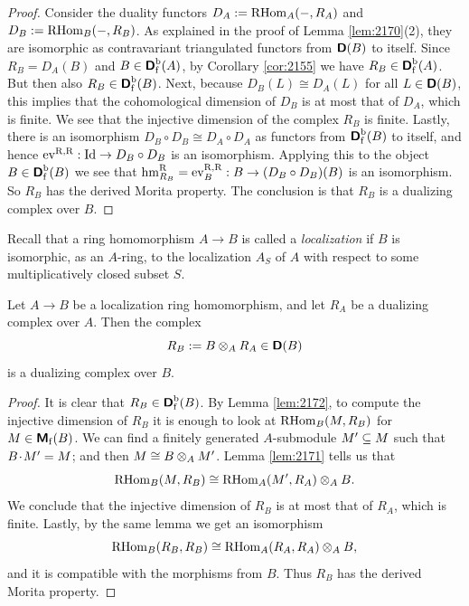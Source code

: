\begin{proof}
Consider the duality functors
$D_{A} := \operatorname{RHom}_{A}(-, R_{A})$
and $D_{B} := \lb \opn{RHom}_B(-, R_B)$.
As explained in the proof of Lemma \ref{lem:2170}(2),
they are isomorphic as contravariant triangulated functors from $\boldsymbol{\mathsf{D}}(B)$ 
to itself. 
Since $R_{B} = D_A(B)$ and $B \in \boldsymbol{\mathsf{D}}^{\mathrm{b}}_{\mathrm{f}}(A)$,
by Corollary \ref{cor:2155} we have 
$R_B \in \boldsymbol{\mathsf{D}}^{\mathrm{b}}_{\mathrm{f}}(A)$. 
But then also $R_B \in \boldsymbol{\mathsf{D}}^{\mathrm{b}}_{\mathrm{f}}(B)$.
Next, because $D_B(L) \cong D_A(L)$ for all $L \in \boldsymbol{\mathsf{D}}(B)$, this implies 
that the cohomological dimension of $D_B$ is at most that of 
$D_A$, which is finite. We see that the injective dimension of the complex 
$R_B$ is finite. Lastly, there is an isomorphism
$D_B \circ D_B \cong D_A \circ D_A$
as functors from $\boldsymbol{\mathsf{D}}^{\mathrm{b}}_{\mathrm{f}}(B)$ to itself, 
and hence 
$\operatorname{ev}^{\mathrm{R, R}} : \operatorname{Id} \to D_B \circ D_B$ is an isomorphism.
Applying this to the object 
$B \in \boldsymbol{\mathsf{D}}^{\mathrm{b}}_{\mathrm{f}}(B)$
we see that 
$\operatorname{hm}^{\mathrm{R}}_{R_B} = \operatorname{ev}^{\mathrm{R, R}}_{B} : B \to 
(D_B \circ D_{B})(B)$  
is an isomorphism. So $R_B$ has the derived Morita property.
The conclusion is that $R_B$ is a dualizing complex over 
$B$. 
\end{proof}

Recall that a ring homomorphism $A \to B$ is called a {\em localization} if $B$ 
is isomorphic, as an $A$-ring, to the localization $A_S$ of $A$ with respect to 
some multiplicatively closed subset $S$. 

\begin{prop} \label{prop:2201}
Let $A \to B$ be a localization ring homomorphism, and let $R_A$ be a 
dualizing complex over $A$. Then the complex 
\[ R_B := B \otimes_A R_A \in \boldsymbol{\mathsf{D}}(B) \]
is a dualizing complex over $B$. 
\end{prop}

\begin{proof}
It is clear that 
$R_B \in \boldsymbol{\mathsf{D}}^{\mathrm{b}}_{\mathrm{f}}(B)$.
By Lemma \ref{lem:2172}, to compute the injective dimension of 
$R_B$ it is enough to look at $\operatorname{RHom}_B(M, R_B)$
for $M \in \boldsymbol{\mathsf{M}}_{\mathrm{f}}(B)$. 
We can find a finitely generated $A$-submodule $M' \subseteq M$ such that 
$B \mspace{1.5mu}{\cdot}\mspace{1.5mu} M' = M$; and then $M \cong B \otimes_{A} M'$. Lemma \ref{lem:2171} 
tells us that 
\[ \operatorname{RHom}_B(M, R_B) \cong 
\operatorname{RHom}_{A}(M', R_{A}) \otimes_{A} B . \]
We conclude that the injective dimension of $R_B$ is at most that of 
$R_{A}$, which  is finite. Lastly, by the same lemma we get an isomorphism 
\[ \operatorname{RHom}_B(R_B, R_B) \cong 
\operatorname{RHom}_{A}(R_{A}, R_{A}) \otimes_{A} B  , \]
and it is compatible with the morphisms from $B$. Thus $R_B$ has the derived 
Morita property.  
\end{proof}

